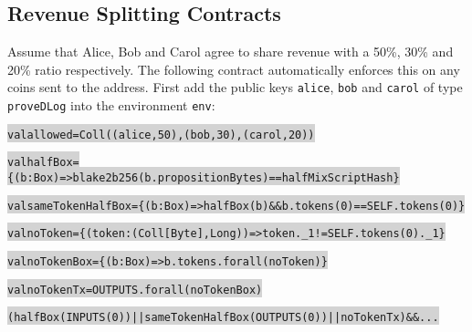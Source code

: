 \documentclass[11pt]{article}
\newcommand\Hi[2][lightgray]{%
	\hspace*{-\fboxsep}%
	\colorbox{#1}{#2}%
	\hspace*{-\fboxsep}%
}
\newcommand{\langname}{ErgoScript\xspace}
\begin{document}
\subsection{Revenue Splitting Contracts}

Assume that Alice, Bob and Carol agree to share revenue with a 50\%, 30\% and 20\% ratio respectively. The following contract automatically enforces this on any coins sent to the address. First add the public keys \texttt{alice}, \texttt{bob}  and \texttt{carol} of type \texttt{proveDLog} into the environment \texttt{env}: 
\begin{alltt}
	\Hi{val allowed = Coll((alice, 50), (bob, 30), (carol, 20))} 
	\Hi{val halfBox = \{(b:Box) => blake2b256(b.propositionBytes) == halfMixScriptHash\}}
	\Hi{val sameTokenHalfBox = \{(b:Box) => halfBox(b) && b.tokens(0) == SELF.tokens(0)\}}
	\Hi{val noToken = \{(token:(Coll[Byte], Long)) => token._1 != SELF.tokens(0)._1\}}
	\Hi{val noTokenBox = \{(b:Box) => b.tokens.forall(noToken)\}}
	\Hi{val noTokenTx = OUTPUTS.forall(noTokenBox)} 
	\Hi{(halfBox(INPUTS(0)) || sameTokenHalfBox(OUTPUTS(0)) || noTokenTx) && ...} 
\end{alltt}






\end{document}

